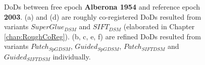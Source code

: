 \begin{figure}[htbp]
\begin{center}
{\begin{minipage}[t]{0.31\linewidth}
			\end{minipage}%
		}
		
		\caption{\ac{DoD}s between free epoch \textbf{Alberona 1954} and reference epoch \textbf{2003}. (a) and (d) are roughly co-registered \ac{DoD}s resulted from variants $SuperGlue_{DSM}$ and $SIFT_{DSM}$ (elaborated in Chapter \ref{chap:RoughCoReg}). (b, c, e, f) are refined \ac{DoD}s resulted from variants $Patch_{SpGDSM}$, $Guided_{SpGDSM}$, $Patch_{SIFTDSM}$ and $Guided_{SIFTDSM}$ individually.}
		\label{PreciseDoDAlberona}
	\end{center}
\end{figure} 


